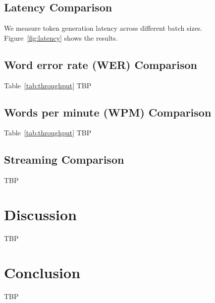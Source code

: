 \documentclass[11pt, oneside]{article}   	%
\begin{document}
\subsection{Latency Comparison}
We measure token generation latency across different batch sizes. Figure~\ref{fig:latency} shows the results.

\subsection{Word error rate (WER) Comparison}
Table~\ref{tab:throughput} TBP

\subsection{Words per minute (WPM) Comparison}
Table~\ref{tab:throughput} TBP

\subsection{Streaming Comparison}
TBP

\section{Discussion}
TBP

\section{Conclusion}
TBP



\end{document}
